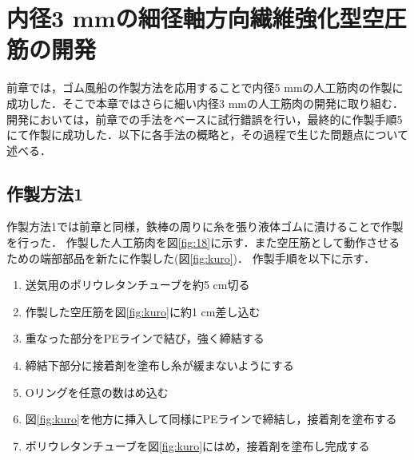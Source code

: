 \newpage

\section{内径3 mmの細径軸方向繊維強化型空圧筋の開発}
前章では，ゴム風船の作製方法を応用することで内径5 mmの人工筋肉の作製に成功した．そこで本章ではさらに細い内径3 mmの人工筋肉の開発に取り組む．
開発においては，前章での手法をベースに試行錯誤を行い，最終的に作製手順5にて作製に成功した．以下に各手法の概略と，その過程で生じた問題点について述べる．

\subsection{作製方法1}
作製方法1では前章と同様，鉄棒の周りに糸を張り液体ゴムに漬けることで作製を行った．
作製した人工筋肉を図\ref{fig:18}に示す．また空圧筋として動作させるための端部部品を新たに作製した(図\ref{fig:kuro})．
作製手順を以下に示す．
\begin{enumerate}
  \item 送気用のポリウレタンチューブを約5 cm切る
  \item 作製した空圧筋を図\ref{fig:kuro}に約1 cm差し込む
  \item 重なった部分をPEラインで結び，強く締結する
  \item 締結下部分に接着剤を塗布し糸が緩まないようにする
  \item Oリングを任意の数はめ込む
  \item 図\ref{fig:kuro}を他方に挿入して同様にPEラインで締結し，接着剤を塗布する
  \item ポリウレタンチューブを図\ref{fig:kuro}にはめ，接着剤を塗布し完成する
\end{enumerate}

